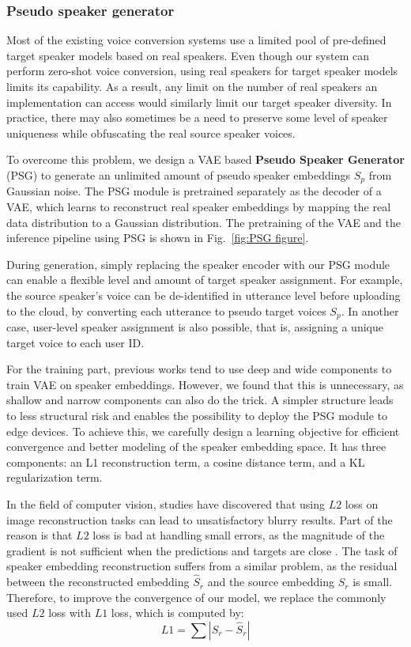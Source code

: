 \documentclass[a4paper]{article}
\begin{document}
    
\subsubsection{Pseudo speaker generator}
\label{PSG}
    Most of the existing voice conversion systems use a limited pool of pre-defined target speaker models based on real speakers. Even though our system can perform zero-shot voice conversion, using real speakers for target speaker models limits its capability. As a result, any limit on the number of real speakers an implementation can access would similarly limit our target speaker diversity. In practice, there may also sometimes be a need to preserve some level of speaker uniqueness while obfuscating the real source speaker voices.
    
    To overcome this problem, we design a VAE \cite{kingma2013auto} based \textbf{Pseudo Speaker Generator} (PSG) to generate an unlimited amount of pseudo speaker embeddings $S_p$ from Gaussian noise. The PSG module is pretrained separately as the decoder of a VAE, which learns to reconstruct real speaker embeddings by mapping the real data distribution to a Gaussian distribution. The pretraining of the VAE and the inference pipeline using PSG is shown in Fig.~\ref{fig:PSG figure}. 
    
    During generation, simply replacing the speaker encoder with our PSG module can enable a flexible level and amount of target speaker assignment. For example, the source speaker's voice can be de-identified in utterance level before uploading to the cloud, by converting each utterance to pseudo target voices $S_p$. In another case, user-level speaker assignment is also possible, that is, assigning a unique target voice to each user ID.
    
    For the training part, previous works \cite{zhang2019vae, wang2019vae} tend to use deep and wide components to train VAE on speaker embeddings. However, we found that this is unnecessary, as shallow and narrow components can also do the trick. A simpler structure leads to less structural risk and enables the possibility to deploy the PSG module to edge devices. To achieve this, we carefully design a learning objective for efficient convergence and better modeling of the speaker embedding space. It has three components: an L1 reconstruction term, a cosine distance term, and a KL regularization term.
    
    In the field of computer vision, studies \cite{zhao2016loss, wang2009mean} have discovered that using $L2$ loss on image reconstruction tasks can lead to unsatisfactory blurry results. Part of the reason is that $L2$ loss is bad at handling small errors, as the magnitude of the gradient is not sufficient when the predictions and targets are close \cite{feng2018wing}. The task of speaker embedding reconstruction suffers from a similar problem, as the residual between the reconstructed embedding $\hat{S}_{r}$ and the source embedding $S_{r}$ is small. Therefore, to improve the convergence of our model, we replace the commonly used $L2$ loss with $L1$ loss, which is computed by:
    \[L1 = \sum \left| S_{r} - \hat{S}_{r} \right|\]
    
\end{document}
